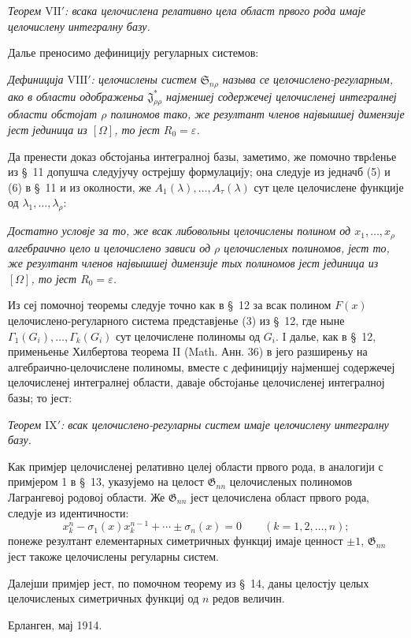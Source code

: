 ﻿\documentclass[11pt]{article}
\providecommand{\Ssys}{\mathfrak{S}}
\providecommand{\Jdom}{\mathfrak{J}}
\providecommand{\Gdom}{\mathfrak{G}}
\providecommand{\eps}{\varepsilon}
\begin{document}
{\itshape Теорем $\mathrm{VII}'$: всака целочислена релативно цела област првого рода имаје целочислену интегралну базу.}

Далье преносимо дефиницију регуларных системов:

{\itshape Дефиниција $\mathrm{VIII}'$: целочислены систем $\Ssys_{n\rho}$ называ се целочислено-регуларным, ако в области одображеньа $\Jdom^*_{\rho\rho}$ најменшеј содержечеј целочисленеј интегралнеј области обстојат $\rho$ полиномов тако, же резултант членов највышшеј димензије јест јединица из $[\Omega]$, то јест $R_0=\eps$.}

Да пренести доказ обстојаньа интегралној базы, заметимо, же помочно тврđенье из \S\ 11 допушча следујучу острејшу формулацију; она следује из једначб (5) и (6) в \S\ 11 и из околности, же $A_1(\lambda),\ldots,A_\tau(\lambda)$ сут целе целочислене функције од $\lambda_1,\ldots,\lambda_\rho$:

{\itshape Достатно условје за то, же всак либовольны целочислены полином од $x_1,\ldots,x_\rho$ алгебраично цело и целочислено зависи од $\rho$ целочисленых полиномов, јест то, же резултант членов највышшеј димензије тых полиномов јест јединица из $[\Omega]$, то јест $R_0=\eps$.}

Из сеј помочној теоремы следује точно как в \S\ 12 за всак полином $F(x)$ целочислено-регуларного система представјенье (3) из \S\ 12, где ныне $\Gamma_1(G_i),\ldots,\Gamma_k(G_i)$ сут целочислене полиномы од $G_i$. I далье, как в \S\ 12, применьенье Хилбертова теорема II (Math. Анн. 36) в јего разширеньу на алгебраично-целочислене полиномы, вместе с дефиницију најменшеј содержечеј целочисленеј интегралнеј области, даваје обстојанье целочисленеј интегралној базы; то јест:

{\itshape Теорем $\mathrm{IX}'$: всак целочислено-регуларны систем имаје целочислену интегралну базу.}

Как примјер целочисленеј релативно целеј области првого рода, в аналогији с примјером 1 в \S\ 13, указујемо на целост $\Gdom_{nn}$ целочисленых полиномов Лагрангевој родовој области. Же $\Gdom_{nn}$ јест целочислена област првого рода, следује из идентичности:
\[
  x_k^n-\sigma_1(x)x_k^{n-1}+\cdots\pm\sigma_n(x)=0
  \qquad(k=1,2,\ldots,n);
\]
понеже резултант елементарных симетричных функциј имаје ценност $\pm1$, $\Gdom_{nn}$ јест такоже целочислены регуларны систем.

Далејши примјер јест, по помочном теорему из \S\ 14, даны целостју целых целочисленых симетричных функциј од $n$ редов величин.

Ерланген, мај 1914.
\end{document}
